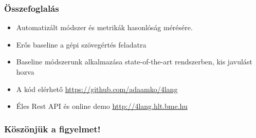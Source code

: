 \documentclass[bigger]{beamer}
\begin{document}
\begin{frame}
\frametitle{Összefoglalás}
	\begin{itemize}
	    \pause \item Automatizált módszer és metrikák hasonlóság mérésére.
	    \pause \item Erős baseline a gépi szövegértés feladatra
	    \pause \item Baseline módszerunk alkalmazása state-of-the-art rendszerben, kis javulást hozva
	    \pause \item A kód elérhető \url{https://github.com/adaamko/4lang}
	    \pause \item Éles Rest API és online demo \url{http://4lang.hlt.bme.hu}
	\end{itemize}

\end{frame}
\begin{frame}
    \frametitle{K\"osz\"onj\"uk a figyelmet!}
    \AtNextBibliography{\tiny}
    \printbibliography
\end{frame}
\end{document}
